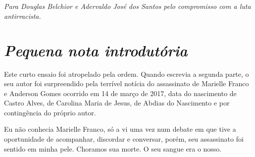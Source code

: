 





















\chapter*{}

\vfill
\epigraph{}{\emph{Para Douglas Belchior e Adervaldo José dos Santos pelo compromisso
com a luta antirracista.}}

\thispagestyle{empty}

\chapter{\emph{Pequena nota introdutória}}

Este curto ensaio foi atropelado pela ordem. Quando escrevia a segunda
parte, o seu autor foi surpreendido pela terrível notícia do assassinato
de Marielle Franco e Anderson Gomes ocorrido em 14 de março de 2017,
data do nascimento de Castro Alves, de Carolina Maria de Jesus, de
Abdias do Nascimento e por contingência do próprio autor.

Eu não conhecia Marielle Franco, só a vi uma vez num debate em que tive
a oportunidade de acompanhar, discordar e conversar, porém, seu
assassinato foi sentido em minha pele. Choramos sua morte. O seu sangue
era o nosso.

